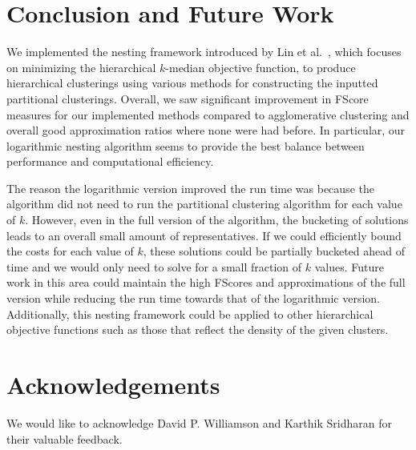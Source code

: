 \documentclass[conference, 10pt, final]{IEEEtran}
\begin{document}
\section{Conclusion and Future Work}
We implemented the nesting framework introduced by Lin et al.~\cite{Lin}, which focuses on minimizing the hierarchical $k$-median objective function, to produce hierarchical clusterings using various methods for constructing the inputted partitional clusterings.  Overall, we saw significant improvement in FScore measures for our implemented methods compared to agglomerative clustering and overall good approximation ratios where none were had before. In particular, our logarithmic nesting algorithm seems to provide the best balance between performance and computational efficiency.

The reason the logarithmic version improved the run time was because the algorithm did not need to run the partitional clustering algorithm for each value of $k$. However, even in the full version of the algorithm, the bucketing of solutions leads to an overall small amount of representatives. If we could efficiently bound the costs for each value of $k$, these solutions could be partially bucketed ahead of time and we would only need to solve for a small fraction of $k$ values. Future work in this area could maintain the high FScores and approximations of the full version while reducing the run time towards that of the logarithmic version. Additionally, this nesting framework could be applied to other hierarchical objective functions such as those that reflect the density of the given clusters. 

\section*{Acknowledgements}
We would like to acknowledge David P. Williamson and Karthik Sridharan for their valuable feedback.






\end{document}
